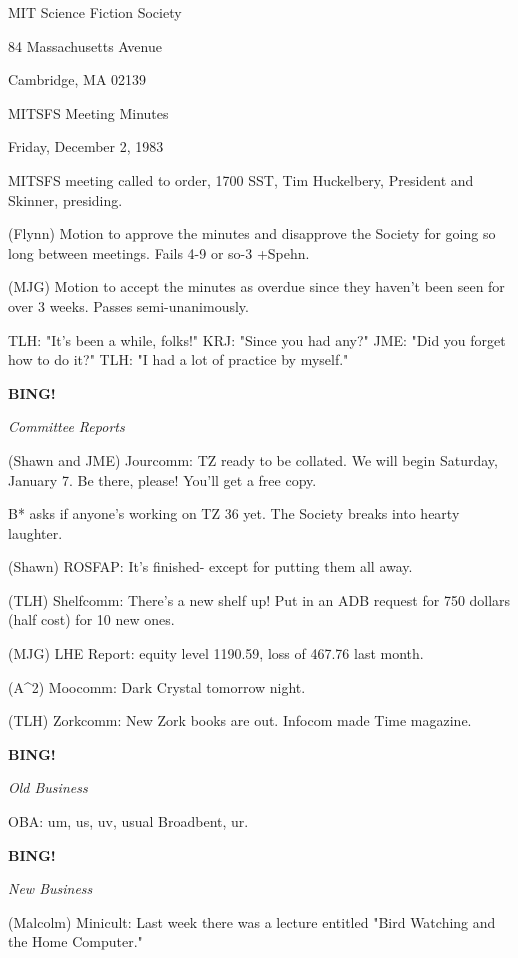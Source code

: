 \documentclass[12pt]{article}
\newcommand{\bing}{{\bf BING!} }
\newcommand{\goto}[1]{\bing \vskip 12pt \centerline{{\em{#1}}}}
\begin{document}
\begin{center}

MIT Science Fiction Society 

84 Massachusetts Avenue

Cambridge, MA 02139

\vspace{12pt}

MITSFS Meeting Minutes 

Friday, December 2, 1983

\end{center}
 
\vspace{18pt}

\setlength{\parskip}{6pt}

\noindent
MITSFS meeting called to order, 1700 SST,
Tim Huckelbery, President and Skinner, presiding.

(Flynn) Motion to approve the minutes and disapprove the Society for going so long between meetings. Fails 4-9 or so-3 +Spehn.

(MJG) Motion to accept the minutes as overdue since they haven't been seen for over 3 weeks. Passes semi-unanimously.

TLH: "It's been a while, folks!" KRJ: "Since you had any?" JME: "Did you forget how to do it?" TLH: "I had a lot of practice by myself."

\goto{Committee Reports}

(Shawn and JME) Jourcomm: TZ ready to be collated. We will begin Saturday, January 7. Be there, please! You'll get a free copy.

B* asks if anyone's working on TZ 36 yet. The Society breaks into hearty laughter.

(Shawn) ROSFAP: It's finished- except for putting them all away.

(TLH) Shelfcomm: There's a new shelf up! Put in an ADB request for 750 dollars (half cost) for 10 new ones.

(MJG) LHE Report: equity level 1190.59, loss of 467.76 last month.

(A^2) Moocomm: Dark Crystal tomorrow night.

(TLH) Zorkcomm: New Zork books are out. Infocom made Time magazine.

\goto{Old Business}

OBA: um, us, uv, usual Broadbent, ur.

\goto{New Business}

(Malcolm) Minicult: Last week there was a lecture entitled "Bird Watching and the Home Computer."
\end{document}
